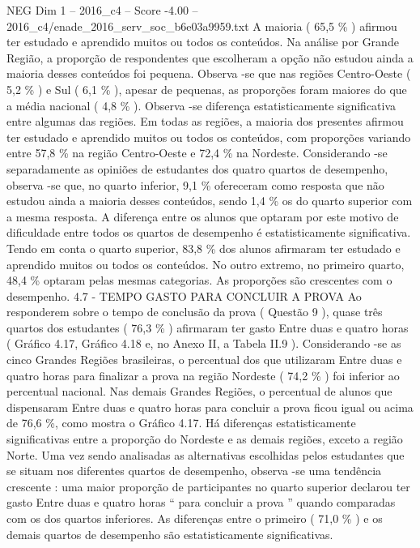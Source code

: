 \begin{textsample}{NEG Dim 1 – 2016\_c4 – Score -4.00 – 2016\_c4/enade\_2016\_serv\_soc\_b6e03a9959.txt}
A maioria ( 65,5 \% ) afirmou ter estudado e aprendido muitos ou todos os conteúdos.
Na análise por Grande Região, a proporção de respondentes que escolheram a opção não estudou ainda a maioria desses conteúdos foi pequena.
Observa -se que nas regiões Centro-Oeste ( 5,2 \% ) e Sul ( 6,1 \% ), apesar de pequenas, as proporções foram maiores do que a média nacional ( 4,8 \% ).
Observa -se diferença estatisticamente significativa entre algumas das regiões.
Em todas as regiões, a maioria dos presentes afirmou ter estudado e aprendido muitos ou todos os conteúdos, com proporções variando entre 57,8 \% na região Centro-Oeste e 72,4 \% na Nordeste.
Considerando -se separadamente as opiniões de estudantes dos quatro quartos de desempenho, observa -se que, no quarto inferior, 9,1 \% ofereceram como resposta que não estudou ainda a maioria desses conteúdos, sendo 1,4 \% os do quarto superior com a mesma resposta.
A diferença entre os alunos que optaram por este motivo de dificuldade entre todos os quartos de desempenho é estatisticamente significativa.
Tendo em conta o quarto superior, 83,8 \% dos alunos afirmaram ter estudado e aprendido muitos ou todos os conteúdos.
No outro extremo, no primeiro quarto, 48,4 \% optaram pelas mesmas categorias.
As proporções são crescentes com o desempenho. 4.7 - TEMPO GASTO PARA CONCLUIR A PROVA Ao responderem sobre o tempo de conclusão da prova ( Questão 9 ), quase três quartos dos estudantes ( 76,3 \% ) afirmaram ter gasto Entre duas e quatro horas ( Gráfico 4.17, Gráfico 4.18 e, no Anexo II, a Tabela II.9 ).
Considerando -se as cinco Grandes Regiões brasileiras, o percentual dos que utilizaram Entre duas e quatro horas para finalizar a prova na região Nordeste ( 74,2 \% ) foi inferior ao percentual nacional.
Nas demais Grandes Regiões, o percentual de alunos que dispensaram Entre duas e quatro horas para concluir a prova ficou igual ou acima de 76,6 \%, como mostra o Gráfico 4.17.
Há diferenças estatisticamente significativas entre a proporção do Nordeste e as demais regiões, exceto a região Norte.
Uma vez sendo analisadas as alternativas escolhidas pelos estudantes que se situam nos diferentes quartos de desempenho, observa -se uma tendência crescente : uma maior proporção de participantes no quarto superior declarou ter gasto Entre duas e quatro horas “ para concluir a prova ” quando comparadas com os dos quartos inferiores.
As diferenças entre o primeiro ( 71,0 \% ) e os demais quartos de desempenho são estatisticamente significativas.

\end{textsample}
